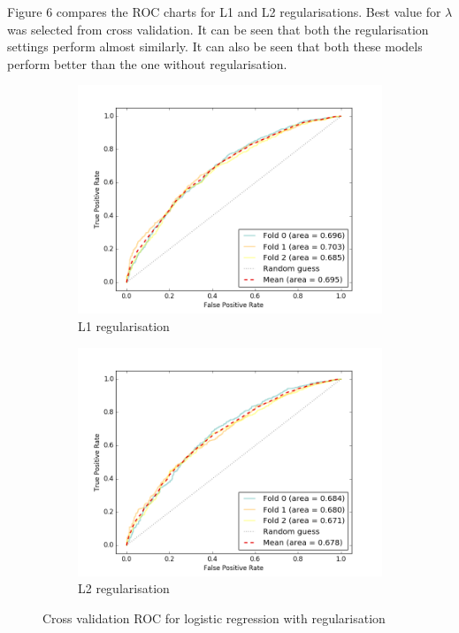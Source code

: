 \documentclass[paper=a4,fontsize=12pt]{article}
\begin{document}
Figure 6 compares the ROC charts for L1 and L2 regularisations. Best value for $\lambda$ was selected from cross validation. It can be seen that both the regularisation settings perform almost similarly. It can also be seen that both these models perform better than the one without regularisation.


\begin{figure}[H]
\centering
\begin{subfigure}{.5\textwidth}
  \centering
  \includegraphics[width=1\linewidth]{05_L1regularisation_hf}
  \caption{L1 regularisation}
  \label{fig:sub1}
\end{subfigure}%
\begin{subfigure}{.5\textwidth}
  \centering
  \includegraphics[width=1\linewidth]{06_L2regularisation_hf}
  \caption{L2 regularisation}
  \label{fig:sub2}
\end{subfigure}
\caption{Cross validation ROC for logistic regression with regularisation}
\label{fig:test}
\end{figure}
\end{document}
